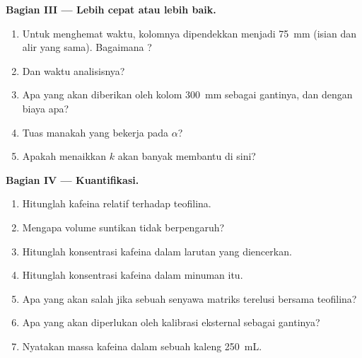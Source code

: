\begin{problem}
\medskip
\noindent\textbf{Bagian III --- Lebih cepat atau lebih baik.}
\begin{enumerate}[resume]
  \item Untuk menghemat waktu, kolomnya dipendekkan menjadi \qty{75}{mm}
        (isian dan alir yang sama). Bagaimana ?
  \item Dan waktu analisisnya?
  \item Apa yang akan diberikan oleh kolom \qty{300}{mm} sebagai gantinya, dan dengan biaya apa?
  \item Tuas manakah yang bekerja pada $\alpha$?
  \item Apakah menaikkan $k$ akan banyak membantu di sini?
\end{enumerate}

\medskip
\noindent\textbf{Bagian IV --- Kuantifikasi.}
\begin{enumerate}[resume]
  \item Hitunglah  kafeina relatif terhadap teofilina.
  \item Mengapa volume suntikan tidak berpengaruh?
  \item Hitunglah konsentrasi kafeina dalam larutan yang diencerkan.
  \item Hitunglah konsentrasi kafeina dalam minuman itu.
  \item Apa yang akan salah jika sebuah senyawa matriks terelusi bersama teofilina?
  \item Apa yang akan diperlukan oleh kalibrasi eksternal sebagai gantinya?
  \item Nyatakan massa kafeina dalam sebuah kaleng \qty{250}{mL}.
\end{enumerate}
\end{problem}
